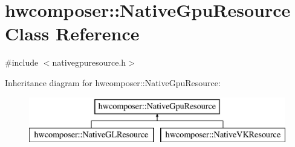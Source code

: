 \hypertarget{classhwcomposer_1_1NativeGpuResource}{}\section{hwcomposer\+:\+:Native\+Gpu\+Resource Class Reference}
\label{classhwcomposer_1_1NativeGpuResource}


{\ttfamily \#include $<$nativegpuresource.\+h$>$}

Inheritance diagram for hwcomposer\+:\+:Native\+Gpu\+Resource\+:\begin{figure}[H]
\begin{center}
\leavevmode
\includegraphics[height=2.000000cm]{classhwcomposer_1_1NativeGpuResource}
\end{center}
\end{figure}
